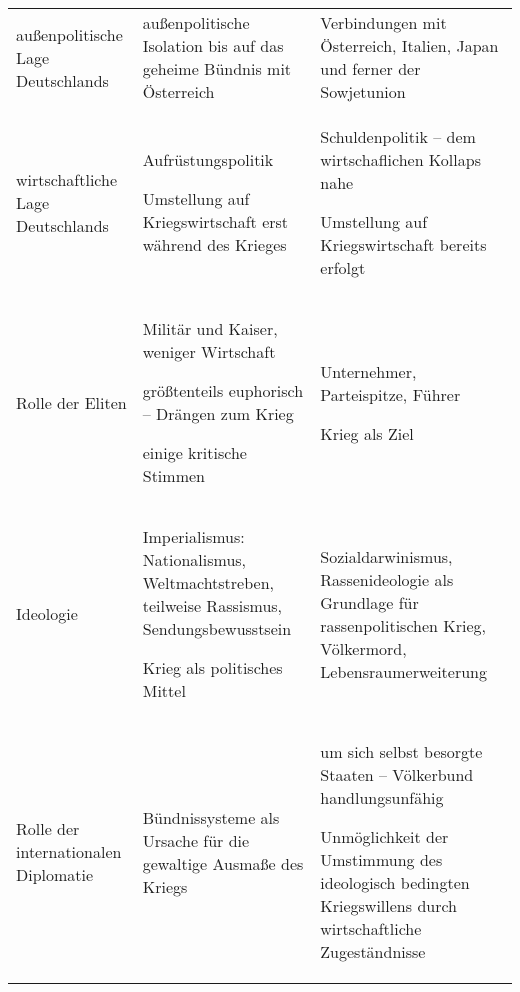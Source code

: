 \begin{table}
\begin{tabularx}{\textwidth}{p{\frstcolwdth}XX}
außenpolitische Lage Deutschlands &
außenpolitische Isolation bis auf das geheime Bündnis mit Österreich &
Verbindungen mit Österreich, Italien, Japan und ferner der Sowjetunion
\\

wirtschaftliche Lage Deutschlands &
\vspace{-0.74em}
\begin{tablist}
\item Aufrüstungspolitik
\item Umstellung auf Kriegswirtschaft erst während des Krieges 
\end{tablist} 
&
\vspace{-0.74em}
\begin{tablist}
\item Schuldenpolitik -- dem wirtschaflichen Kollaps nahe
\item Umstellung auf Kriegswirtschaft bereits erfolgt 
\end{tablist}
\\

Rolle der Eliten &
\vspace{-0.74em}
\begin{tablist}
\item Militär und Kaiser, weniger Wirtschaft
\item größtenteils euphorisch -- Drängen zum Krieg
\item einige kritische Stimmen
\end{tablist}
&
\vspace{-0.74em}
\begin{tablist}
\item Unternehmer, Parteispitze, Führer
\item Krieg als Ziel 
\end{tablist}
\\

Ideologie &
\vspace{-0.73em}
\begin{tablist}
\item Imperialismus: Nationalismus, Weltmachtstreben, teilweise
Rassismus, Sendungsbewusstsein
\item Krieg als politisches Mittel
\end{tablist}
&
Sozialdarwinismus, Rassenideologie als Grundlage für rassenpolitischen
Krieg, Völkermord, Lebensraumerweiterung 
\\

Rolle der internationalen Diplomatie &
Bündnissysteme als Ursache für die gewaltige Ausmaße des Kriegs &
\vspace{-0.74em}
\begin{tablist}
\item um sich selbst besorgte Staaten -- Völkerbund handlungsunfähig 
\item Unmöglichkeit der Umstimmung des ideologisch bedingten
Kriegswillens durch wirtschaftliche Zugeständnisse
\end{tablist}
\\

\bottomrule
\end{tabularx} 
\end{table}
